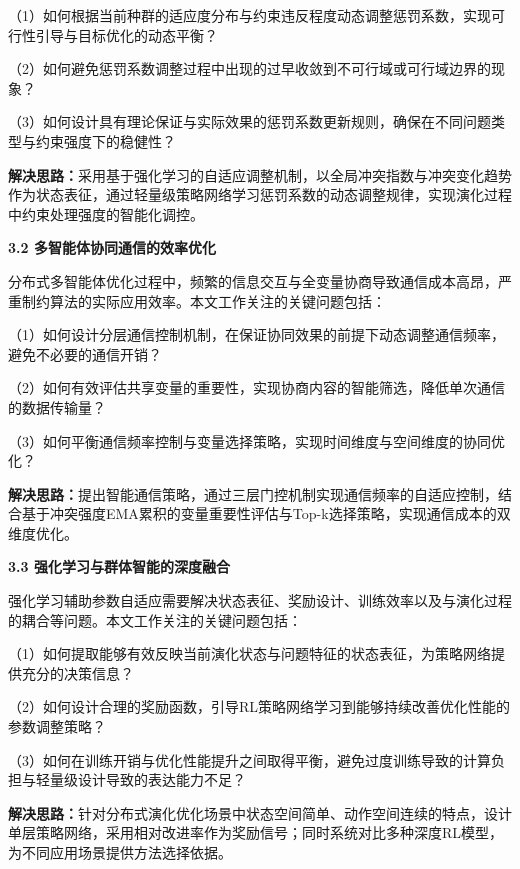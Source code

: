 \begin{titlepage}
\par
\indent
（1）如何根据当前种群的适应度分布与约束违反程度动态调整惩罚系数，实现可行性引导与目标优化的动态平衡？

\par
\indent
（2）如何避免惩罚系数调整过程中出现的过早收敛到不可行域或可行域边界的现象？

\par
\indent
（3）如何设计具有理论保证与实际效果的惩罚系数更新规则，确保在不同问题类型与约束强度下的稳健性？

\par
\indent
\textbf{解决思路：}采用基于强化学习的自适应调整机制，以全局冲突指数与冲突变化趋势作为状态表征，通过轻量级策略网络学习惩罚系数的动态调整规律，实现演化过程中约束处理强度的智能化调控。

\noindent\textbf{3.2 多智能体协同通信的效率优化}

\par
\indent
分布式多智能体优化过程中，频繁的信息交互与全变量协商导致通信成本高昂，严重制约算法的实际应用效率。本文工作关注的关键问题包括：

\par
\indent
（1）如何设计分层通信控制机制，在保证协同效果的前提下动态调整通信频率，避免不必要的通信开销？

\par
\indent
（2）如何有效评估共享变量的重要性，实现协商内容的智能筛选，降低单次通信的数据传输量？

\par
\indent
（3）如何平衡通信频率控制与变量选择策略，实现时间维度与空间维度的协同优化？

\par
\indent
\textbf{解决思路：}提出智能通信策略，通过三层门控机制实现通信频率的自适应控制，结合基于冲突强度EMA累积的变量重要性评估与Top-k选择策略，实现通信成本的双维度优化。

\noindent\textbf{3.3 强化学习与群体智能的深度融合}

\par
\indent
强化学习辅助参数自适应需要解决状态表征、奖励设计、训练效率以及与演化过程的耦合等问题。本文工作关注的关键问题包括：

\par
\indent
（1）如何提取能够有效反映当前演化状态与问题特征的状态表征，为策略网络提供充分的决策信息？

\par
\indent
（2）如何设计合理的奖励函数，引导RL策略网络学习到能够持续改善优化性能的参数调整策略？

\par
\indent
（3）如何在训练开销与优化性能提升之间取得平衡，避免过度训练导致的计算负担与轻量级设计导致的表达能力不足？

\par
\indent
\textbf{解决思路：}针对分布式演化优化场景中状态空间简单、动作空间连续的特点，设计单层策略网络，采用相对改进率作为奖励信号；同时系统对比多种深度RL模型，为不同应用场景提供方法选择依据。

\end{titlepage}
